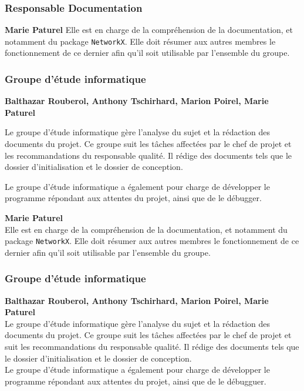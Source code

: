 \subsubsection{Responsable Documentation}
\textbf{Marie Paturel}
Elle est en charge de la compréhension de la documentation, et notamment du package \verb?NetworkX?. Elle doit résumer aux autres membres le fonctionnement de ce dernier afin qu'il soit utilisable par l'ensemble du groupe.

\subsubsection{Groupe d'étude informatique}
\textbf{Balthazar Rouberol, Anthony Tschirhard, Marion Poirel, Marie Paturel}

Le groupe d'étude informatique gère l'analyse du sujet et la rédaction des documents du projet. Ce groupe suit les tâches affectées par le chef de projet et les recommandations du responsable qualité. Il rédige des documents tels que le dossier d'initialisation et le dossier de conception.

Le groupe d'étude informatique a également pour charge de développer le programme répondant aux attentes du projet, ainsi que de le débugger.


\textbf{Marie Paturel}\\
Elle est en charge de la compréhension de la documentation, et notamment du package \texttt{NetworkX}. Elle doit résumer aux autres membres le fonctionnement de ce dernier afin qu'il soit utilisable par l'ensemble du groupe.

\subsubsection{Groupe d'étude informatique}
\textbf{Balthazar Rouberol, Anthony Tschirhard, Marion Poirel, Marie Paturel}\\
Le groupe d'étude informatique gère l'analyse du sujet et la rédaction des documents du projet. Ce groupe suit les tâches affectées par le chef de projet et suit les recommandations du responsable qualité. Il rédige des documents tels que le dossier d'initialisation et le dossier de conception.\\
Le groupe d'étude informatique a également pour charge de développer le programme répondant aux attentes du projet, ainsi que de le débugguer.


